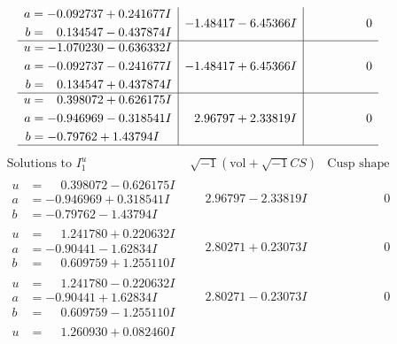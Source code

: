 \documentclass[1p]{elsarticle_modified}
\theoremstyle{definition}
\newcommand{\I}{\sqrt{-1}}
\begin{document}
$$\begin{array}{c|c|c}
\begin{aligned}
a &= -0.092737 + 0.241677 I \\
b &= \phantom{-}0.134547 - 0.437874 I\end{aligned}
 & -1.48417 - 6.45366 I & \phantom{-0.000000 } 0 \\ \hline\begin{aligned}
u &= -1.070230 - 0.636332 I \\
a &= -0.092737 - 0.241677 I \\
b &= \phantom{-}0.134547 + 0.437874 I\end{aligned}
 & -1.48417 + 6.45366 I & \phantom{-0.000000 } 0 \\ \hline\begin{aligned}
u &= \phantom{-}0.398072 + 0.626175 I \\
a &= -0.946969 - 0.318541 I \\
b &= -0.79762 + 1.43794 I\end{aligned}
 & \phantom{-}2.96797 + 2.33819 I & \phantom{-0.000000 } 0\\
 \hline 
 \end{array}$$\newpage$$\begin{array}{c|c|c}  
\text{Solutions to }I^u_{1}& \I (\text{vol} + \sqrt{-1}CS) & \text{Cusp shape}\\
 \hline 
\begin{aligned}
u &= \phantom{-}0.398072 - 0.626175 I \\
a &= -0.946969 + 0.318541 I \\
b &= -0.79762 - 1.43794 I\end{aligned}
 & \phantom{-}2.96797 - 2.33819 I & \phantom{-0.000000 } 0 \\ \hline\begin{aligned}
u &= \phantom{-}1.241780 + 0.220632 I \\
a &= -0.90441 - 1.62834 I \\
b &= \phantom{-}0.609759 + 1.255110 I\end{aligned}
 & \phantom{-}2.80271 + 0.23073 I & \phantom{-0.000000 } 0 \\ \hline\begin{aligned}
u &= \phantom{-}1.241780 - 0.220632 I \\
a &= -0.90441 + 1.62834 I \\
b &= \phantom{-}0.609759 - 1.255110 I\end{aligned}
 & \phantom{-}2.80271 - 0.23073 I & \phantom{-0.000000 } 0 \\ \hline\begin{aligned}
u &= \phantom{-}1.260930 + 0.082460 I \\

\end{aligned}
\end{array}$$
\end{document}

